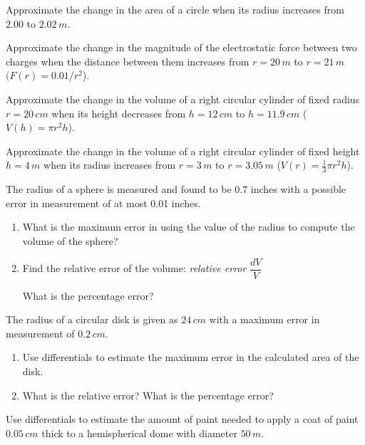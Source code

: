 \documentclass[mathNotesPreamble]{subfiles}
\begin{document}
\begin{ex*}
  Approximate the change in the area of a circle when its radius increases from $2.00$ to $2.02\,m$.
\end{ex*}

\begin{ex*}
  Approximate the change in the magnitude of the electrostatic force between two charges when the distance between them increases from $r=20\,m$ to $r=21\,m$ $(F(r)=0.01/r^2$).
\end{ex*}
\pagebreak

\begin{ex*}
  Approximate the change in the volume of a right circular cylinder of fixed radius $r=20\,cm$ when its height decreases from $h=12\,cm$ to $h=11.9\,cm$ ($V(h)=\pi r^2h$).
\end{ex*}

\begin{ex*}
  Approximate the change in the volume of a right circular cylinder of fixed height $h=4\,m$ when its radius increases from $r=3\,m$ to $r=3.05\,m$ ($V(r)=\frac{1}{3}\pi r^2 h$).
\end{ex*}
\pagebreak

\begin{ex*}
  The radius of a sphere is measured and found to be $0.7$ inches with a possible error in measurement of at most 0.01 inches.
\end{ex*}
\begin{enumerate}[label=\alph*), itemsep=\stretch{1}]
  \item What is the maximum error in using the value of the radius to compute the volume of the sphere?
  \item Find the relative error of the volume: \hfill\textit{relative error} $\dfrac{dV}{V}$\hspace*{50pt}
  
  What is the percentage error?
\end{enumerate}
\pagebreak

\begin{ex*}
  The radius of a circular disk is given as $24\,cm$ with a maximum error in measurement of $0.2\,cm$.
\end{ex*}
\begin{enumerate}[label=\alph*), itemsep=\stretch{1}]
  \item Use differentials to estimate the maximum error in the calculated area of the disk.
  \item What is the relative error? What is the percentage error?
\end{enumerate}
\pagebreak

\begin{ex*}
  Use differentials to estimate the amount of paint needed to apply a coat of paint $0.05\,cm$ thick to a hemispherical dome with diameter $50\,m$.
\end{ex*}
\pagebreak
\end{document}
